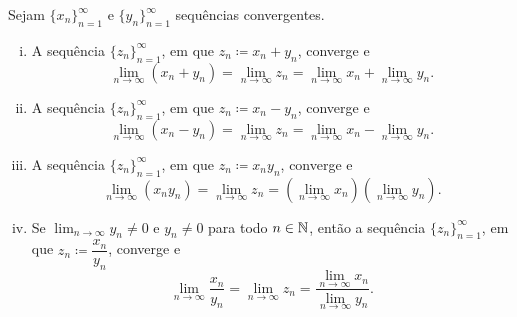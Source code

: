 \begin{prop} \label{prop:contalg}
Sejam $\{ x_n \}_{n=1}^\infty$ e $\{ y_n \}_{n=1}^\infty$ sequências convergentes.
\begin{enumerate}[(i)]
\item \label{prop:contalg:i}
A sequência $\{ z_n \}_{n=1}^\infty$, em que $z_n \coloneqq x_n + y_n$, converge e
\begin{equation*}
\lim_{n \to \infty} (x_n + y_n) =
\lim_{n \to \infty} z_n =
\lim_{n \to \infty} x_n +
\lim_{n \to \infty} y_n .
\end{equation*}
\item \label{prop:contalg:ii}
A sequência $\{ z_n \}_{n=1}^\infty$, em que $z_n \coloneqq x_n - y_n$, converge e
\begin{equation*}
\lim_{n \to \infty} (x_n - y_n) =
\lim_{n \to \infty} z_n =
\lim_{n \to \infty} x_n -
\lim_{n \to \infty} y_n .
\end{equation*}
\item \label{prop:contalg:iii}
A sequência $\{ z_n \}_{n=1}^\infty$, em que $z_n \coloneqq x_n y_n$, converge e
\begin{equation*}
\lim_{n \to \infty} (x_n y_n) =
\lim_{n \to \infty} z_n =
\left( \lim_{n \to \infty} x_n \right)
\left( \lim_{n \to \infty} y_n \right) .
\end{equation*}
\item \label{prop:contalg:iv}
Se $\lim_{n\to\infty} y_n \neq 0$ e $y_n \neq 0$ para todo $n \in {\mathbb{N}}$, então
a sequência $\{ z_n \}_{n=1}^\infty$, em que $z_n \coloneqq \dfrac{x_n}{y_n}$, converge e
\begin{equation*}
\lim_{n \to \infty} \frac{x_n}{y_n} =
\lim_{n \to \infty} z_n =
\frac{\lim_{n \to \infty} x_n}{\lim_{n \to \infty} y_n} .
\end{equation*}
\end{enumerate}
\end{prop}

